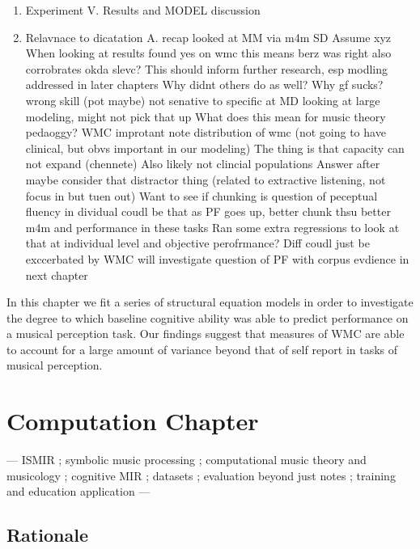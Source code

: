 \documentclass[]{book}
\begin{document}
\begin{enumerate}
\def\labelenumi{\Roman{enumi}.}
\setcounter{enumi}{3}
\item
  Experiment
  V. Results and MODEL discussion
\item
  Relavnace to dicatation
  A. recap looked at MM via m4m SD
  Assume xyz
  When looking at results found yes on wmc
  this means berz was right
  also corrobrates okda slevc?
  This should inform further research, esp modling addressed in later chapters
  Why didnt others do as well?
  Why gf sucks? wrong skill (pot maybe)
  not senative to specific at MD
  looking at large modeling, might not pick that up
  What does this mean for music theory pedaoggy?
  WMC improtant
  note distribution of wmc (not going to have clinical, but obvs important in our modeling)
  The thing is that capacity can not expand (chennete)
  Also likely not clincial populations
  Answer after maybe consider that distractor thing (related to extractive listening, not focus in but tuen out)
  Want to see if chunking is question of peceptual fluency in dividual
  coudl be that as PF goes up, better chunk
  thsu better m4m and performance in these tasks
  Ran some extra regressions to look at that at individual level and objective perofrmance?
  Diff coudl just be exccerbated by WMC
  will investigate question of PF with corpus evdience in next chapter
\end{enumerate}

In this chapter we fit a series of structural equation models in order to investigate the degree to which baseline cognitive ability was able to predict performance on a musical perception task.
Our findings suggest that measures of WMC are able to account for a large amount of variance beyond that of self report in tasks of musical perception.

\hypertarget{computation-chapter}{%
\chapter{Computation Chapter}\label{computation-chapter}}

--- ISMIR
; symbolic music processing
; computational music theory and musicology
; cognitive MIR
; datasets
; evaluation beyond just notes
; training and education application
---

\hypertarget{rationale-1}{%
\section{Rationale}\label{rationale-1}}
\end{document}
